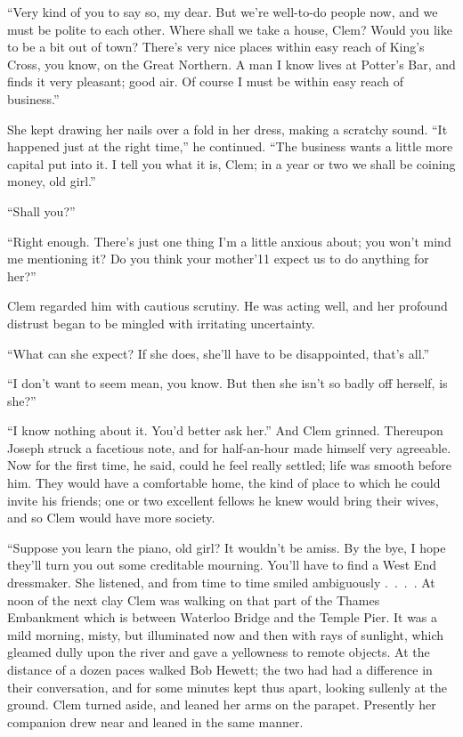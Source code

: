 ``Very kind of you to say so, my dear. But we're well-to-do people now,
and we must be polite to each other. Where shall we take a house, Clem?
Would you like to be a bit out of town? There's very nice places within
easy reach of King's Cross, you know, on the Great Northern. A man I
know lives at Potter's Bar, and finds it very pleasant; good air. Of
course I must be within easy reach of business.''

She kept drawing her nails over a fold in her dress, making a scratchy
sound. ``It happened just at the right time,'' he continued. ``The
business wants a little more capital put into it. I tell you what it is,
Clem; in a year or two we shall be coining money, old girl.''

``Shall you?''

``Right enough. There's just one thing I'm a little anxious about; you
won't mind me {\protect\hypertarget{181}{}{}}mentioning it? Do you think
your mother'11 expect us to do anything for her?''

Clem regarded him with cautious scrutiny. He was acting well, and her
profound distrust began to be mingled with irritating uncertainty.

``What can she expect? If she does, she'll have to be disappointed,
that's all.''

``I don't want to seem mean, you know. But then she isn't so badly off
herself, is she?''

``I know nothing about it. You'd better ask her.'' And Clem grinned.
Thereupon Joseph struck a facetious note, and for half-an-hour made
himself very agreeable. Now for the first time, he said, could he feel
really settled; life was smooth before him. They would have a
comfortable home, the kind of place to which he could invite his
friends; one or two excellent fellows he knew would bring their wives,
and so Clem would have more society.

``Suppose you learn the piano, old girl? It wouldn't be amiss. By the
bye, I hope they'll turn you out some creditable mourning. You'll have
to find a West End dressmaker. She listened, and from time to time
smiled {ambiguously {.~.~.~.}} {\protect\hypertarget{182}{}{}}At noon of
the next clay Clem was walking on that part of the Thames Embankment
which is between Waterloo Bridge and the Temple Pier. It was a mild
morning, misty, but illuminated now and then with rays of sunlight,
which gleamed dully upon the river and gave a yellowness to remote
objects. At the distance of a dozen paces walked Bob Hewett; the two had
had a difference in their conversation, and for some minutes kept thus
apart, looking sullenly at the ground. Clem turned aside, and leaned her
arms on the parapet. Presently her companion drew near and leaned in the
same manner.

